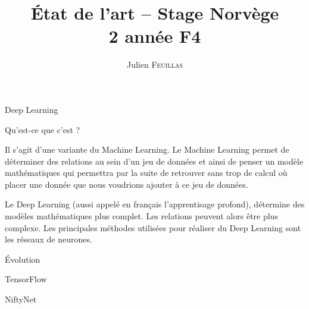 \documentclass{book}
\title{\'Etat de l'art -- Stage Norvège\\2\up{ème} année F4}
\author{Julien \textsc{Feuillas}}
\newcommand{\p}{\vspace{0.2cm}}
\begin{document}
  \pagedegarde

  \thispagestyle{empty}
	\pagestyle{plain}

	\cleardoublepage
	\renewcommand{\cleardoublepage}{\clearpage}

  \begin{chapter}{Deep Learning}

    \begin{section}{Qu'est-ce que c'est ?}

      Il s'agit d'une variante du Machine Learning. Le Machine Learning permet de déterminer des relations au sein d'un jeu de données et ainsi de penser un modèle mathématiques qui permettra par la suite de retrouver sans trop de calcul où placer une donnée que nous voudrions ajouter à ce jeu de données.\p

      Le Deep Learning (aussi appelé en français l'apprentisage profond), détermine des modèles mathématiques plus complet. Les relations peuvent alors être plus complexe. Les principales méthodes utilisées pour réaliser du Deep Learning sont les réseaux de neurones.\p

    \end{section}

    \begin{section}{\'Evolution}



    \end{section}

  \end{chapter}

  \begin{chapter}{TensorFlow}

  \end{chapter}

  \begin{chapter}{NiftyNet}

  \end{chapter}

  \nocite{*}
  
  
\end{document}
